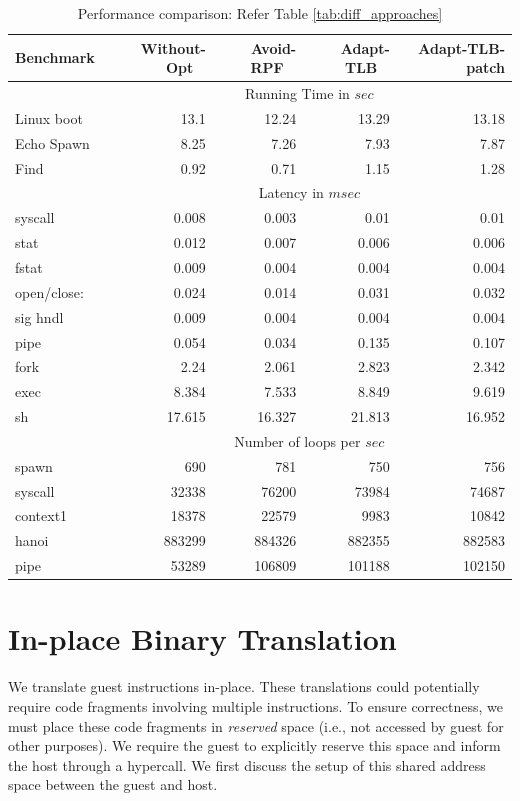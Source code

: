 \documentclass[10pt,twocolumn]{article}
\begin{document}
\begin{table}
\centering
\caption{Performance comparison: Refer Table \ref{tab:diff_approaches}}
      \begin{tabular}{|l|  r r r r|} \hline
	         Benchmark\verb, ,& Without-Opt \verb, ,& Avoid-RPF \verb, , & Adapt-TLB \verb, ,& Adapt-TLB-patch \\ \hline

     & \multicolumn{4}{c|}{ Running Time in $sec$}\\ \cline {2-5}  
     Linux boot	&	13.1	&	12.24	&	13.29	&	13.18	\\
Echo Spawn	&	8.25	&	7.26	&	7.93	&	7.87	\\
Find	&	0.92	&	0.71	&	1.15	&	1.28	\\ \cline{2-5}
	   
     & \multicolumn{4}{c|}{Latency in $msec$}\\  \cline{2-5}
syscall	&	0.008	&	0.003	&	0.01	&	0.01	\\
stat	&	0.012	&	0.007	&	0.006	&	0.006	\\
fstat	&	0.009	&	0.004	&	0.004	&	0.004	\\
open/close:	&	0.024	&	0.014	&	0.031	&	0.032	\\
sig hndl	&	0.009	&	0.004	&	0.004	&	0.004	\\
pipe 	&	0.054	&	0.034	&	0.135	&	0.107	\\
fork	&	2.24	&	2.061	&	2.823	&	2.342	\\
exec	&	8.384	&	7.533	&	8.849	&	9.619	\\
sh	&	17.615	&	16.327	&	21.813	&	16.952	\\ \cline{2-5}
     & \multicolumn{4}{c|}{Number of loops per $sec$}\\  \cline{2-5}

spawn	&	690	&	781	&	750	&	756	\\
syscall	&	32338	&	76200	&	73984	&	74687	\\
context1	&	18378	&	22579	&	9983	&	10842	\\
hanoi	&	883299	&	884326	&	882355	&	882583	\\
pipe	&	53289	&	106809	&	101188	&	102150	\\
	

        \hline
      \end{tabular}
\label{tab:perf_approaches}
\end{table} 

\section{In-place Binary Translation}
\label{sec:bintrans}
We translate guest instructions in-place. These translations could potentially
require code fragments involving multiple instructions. To ensure correctness, we
must place these code fragments in {\em reserved} space (i.e., not accessed by
guest for other purposes). We require the guest to explicitly reserve this space
and inform the host through a hypercall. We first discuss the setup of this shared
address space between the guest and host.
\end{document}
